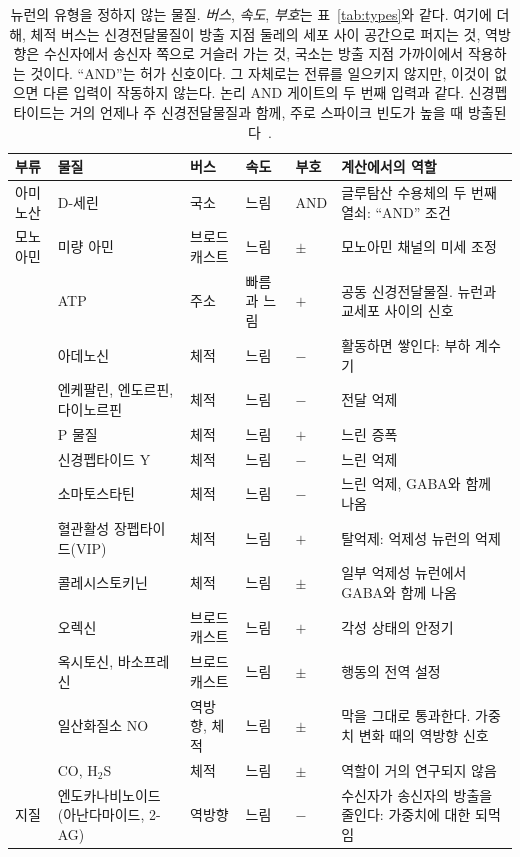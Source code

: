 \begin{table}[t]
\centering
\footnotesize
\setlength{\tabcolsep}{4pt}
\renewcommand{\arraystretch}{1.12}
\begin{tabular}{>{\raggedright}p{2.25cm}>{\raggedright}p{2.8cm}>{\raggedright}p{1.8cm}>{\raggedright}p{1.5cm}>{\centering}p{0.8cm}>{\raggedright\arraybackslash}p{4.3cm}}
\toprule
부류 & 물질 & 버스 & 속도 & 부호 & 계산에서의 역할 \\
\midrule
아미노산 & D-세린 & 국소 & 느림 & AND & 글루탐산 수용체의 두 번째 열쇠: “AND” 조건 \\
\midrule
모노아민 & 미량 아민 & 브로드캐스트 & 느림 & $\pm$ & 모노아민 채널의 미세 조정 \\
\midrule
\multirow{2}{2.25cm}{퓨린}
 & ATP & 주소 & 빠름과 느림 & $+$ & 공동 신경전달물질. 뉴런과 교세포 사이의 신호 \\
 & 아데노신 & 체적 & 느림 & $-$ & 활동하면 쌓인다: 부하 계수기~\cite{Dunwiddie2001} \\
\midrule
\multirow{8}{2.25cm}{신경펩타이드 (100가지 이상)}
 & 엔케팔린, 엔도르핀, 다이노르핀 & 체적 & 느림 & $-$ & 전달 억제 \\
 & P 물질 & 체적 & 느림 & $+$ & 느린 증폭 \\
 & 신경펩타이드 Y & 체적 & 느림 & $-$ & 느린 억제 \\
 & 소마토스타틴 & 체적 & 느림 & $-$ & 느린 억제, GABA와 함께 나옴 \\
 & 혈관활성 장펩타이드(VIP) & 체적 & 느림 & $+$ & 탈억제: 억제성 뉴런의 억제 \\
 & 콜레시스토키닌 & 체적 & 느림 & $\pm$ & 일부 억제성 뉴런에서 GABA와 함께 나옴 \\
 & 오렉신 & 브로드캐스트 & 느림 & $+$ & 각성 상태의 안정기 \\
 & 옥시토신, 바소프레신 & 브로드캐스트 & 느림 & $\pm$ & 행동의 전역 설정 \\
\midrule
\multirow{2}{2.25cm}{기체}
 & 일산화질소 NO & 역방향, 체적 & 느림 & $\pm$ & 막을 그대로 통과한다. 가중치 변화 때의 역방향 신호~\cite{Garthwaite2008} \\
 & CO, H$_2$S & 체적 & 느림 & $\pm$ & 역할이 거의 연구되지 않음 \\
\midrule
지질 & 엔도카나비노이드 (아난다마이드, 2-AG) & 역방향 & 느림 & $-$ & 수신자가 송신자의 방출을 줄인다: 가중치에 대한 되먹임~\cite{WilsonNicoll2001} \\
\bottomrule
\end{tabular}
\caption{뉴런의 유형을 정하지 않는 물질. \emph{버스}, \emph{속도}, \emph{부호}는 표~\ref{tab:types}와 같다. 여기에 더해, 체적 버스는 신경전달물질이 방출 지점 둘레의 세포 사이 공간으로 퍼지는 것, 역방향은 수신자에서 송신자 쪽으로 거슬러 가는 것, 국소는 방출 지점 가까이에서 작용하는 것이다. “AND”는 허가 신호이다. 그 자체로는 전류를 일으키지 않지만, 이것이 없으면 다른 입력이 작동하지 않는다. 논리 AND 게이트의 두 번째 입력과 같다. 신경펩타이드는 거의 언제나 주 신경전달물질과 함께, 주로 스파이크 빈도가 높을 때 방출된다~\cite{vandenPol2012}.}
\label{tab:othermediators}
\end{table}

